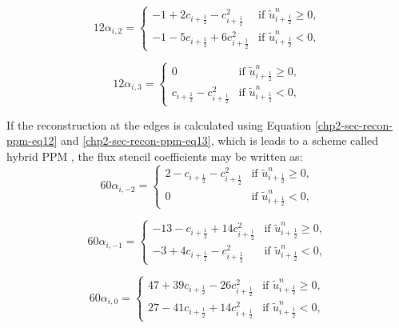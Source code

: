 \begin{equation*}
	12\alpha_{i,2} =  
    	\begin{cases}
		-1 +  2c_{i+\frac{1}{2}} -   c_{i+\frac{1}{2}}^2 
		& \text{if } \tilde{u}_{i+\frac{1}{2}}^n \geq 0,\\
		-1 - 5c_{i+\frac{1}{2}} +  6c_{i+\frac{1}{2}}^2 & \text{if } \tilde{u}_{i+\frac{1}{2}}^n<0,
    	\end{cases}
\end{equation*}

\begin{equation*}
	12\alpha_{i,3} =  
    	\begin{cases}
		0 & \text{if } \tilde{u}_{i+\frac{1}{2}}^n \geq 0,\\
		c_{i+\frac{1}{2}}-   c_{i+\frac{1}{2}}^2 & \text{if } \tilde{u}_{i+\frac{1}{2}}^n<0,
    	\end{cases}
\end{equation*}

If the reconstruction at the edges is calculated using Equation \eqref{chp2-sec-recon-ppm-eq12}
and \eqref{chp2-sec-recon-ppm-eq13}, which is leads to a scheme called hybrid PPM \citep{putman:2007}, 
the flux stencil coefficients may be written as:
\begin{equation*}
	60\alpha_{i,-2} =  
    	\begin{cases}
		2 - c_{i+\frac{1}{2}}-c_{i+\frac{1}{2}}^2 &
		\text{if } \tilde{u}_{i+\frac{1}{2}}^n \geq 0,\\
		0 & \text{if } \tilde{u}_{i+\frac{1}{2}}^n<0,
    	\end{cases}
\end{equation*}

\begin{equation*}
	60\alpha_{i,-1} =  
    	\begin{cases}
		-13 - c_{i+\frac{1}{2}}  + 14c_{i+\frac{1}{2}}^2 
		& \text{if } \tilde{u}_{i+\frac{1}{2}}^n \geq 0,\\
		-3 +  4c_{i+\frac{1}{2}}   -   c_{i+\frac{1}{2}}^2 & \text{if } \tilde{u}_{i+\frac{1}{2}}^n<0,
    	\end{cases}
\end{equation*}

\begin{equation*}
	60\alpha_{i,0} =  
    	\begin{cases}
		47 + 39c_{i+\frac{1}{2}} - 26c_{i+\frac{1}{2}}^2 
		& \text{if } \tilde{u}_{i+\frac{1}{2}}^n \geq 0,\\
		27 - 41c_{i+\frac{1}{2}}  +  14c_{i+\frac{1}{2}}^2 & \text{if } \tilde{u}_{i+\frac{1}{2}}^n<0,
    	\end{cases}
\end{equation*}

